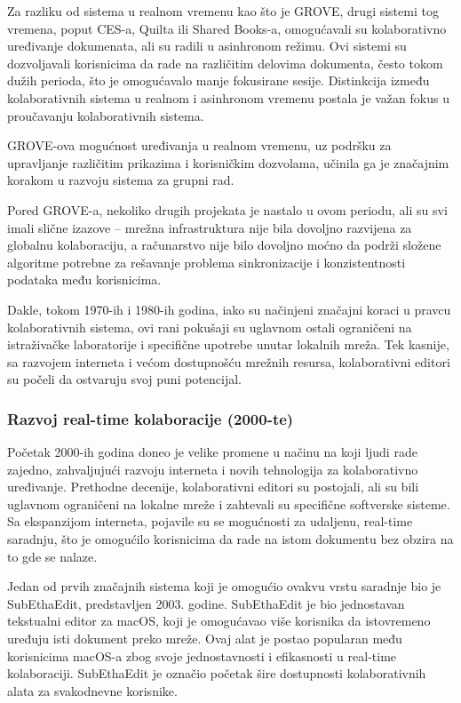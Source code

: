 \documentclass[12pt]{article}
\begin{document}
Za razliku od sistema u realnom vremenu kao što je GROVE, drugi sistemi tog vremena, poput CES-a, Quilta ili Shared Books-a, omogućavali su kolaborativno uređivanje dokumenata, ali su radili u asinhronom režimu. Ovi sistemi su dozvoljavali korisnicima da rade na različitim delovima dokumenta, često tokom dužih perioda, što je omogućavalo manje fokusirane sesije. Distinkcija između kolaborativnih sistema u realnom i asinhronom vremenu postala je važan fokus u proučavanju kolaborativnih sistema.
    
GROVE-ova mogućnost uređivanja u realnom vremenu, uz podršku za upravljanje različitim prikazima i korisničkim dozvolama, učinila ga je značajnim korakom u razvoju sistema za grupni rad.
    
Pored GROVE-a, nekoliko drugih projekata je nastalo u ovom periodu, ali su svi imali slične izazove – mrežna infrastruktura nije bila dovoljno razvijena za globalnu kolaboraciju, a računarstvo nije bilo dovoljno moćno da podrži složene algoritme potrebne za rešavanje problema sinkronizacije i konzistentnosti podataka među korisnicima.
    
Dakle, tokom 1970-ih i 1980-ih godina, iako su načinjeni značajni koraci u pravcu kolaborativnih sistema, ovi rani pokušaji su uglavnom ostali ograničeni na istraživačke laboratorije i specifične upotrebe unutar lokalnih mreža. Tek kasnije, sa razvojem interneta i većom dostupnošću mrežnih resursa, kolaborativni editori su počeli da ostvaruju svoj puni potencijal.

\subsubsection{Razvoj real-time kolaboracije (2000-te)}

Početak 2000-ih godina doneo je velike promene u načinu na koji ljudi rade zajedno, zahvaljujući razvoju interneta i novih tehnologija za kolaborativno uređivanje. Prethodne decenije, kolaborativni editori su postojali, ali su bili uglavnom ograničeni na lokalne mreže i zahtevali su specifične softverske sisteme. Sa ekspanzijom interneta, pojavile su se mogućnosti za udaljenu, real-time saradnju, što je omogućilo korisnicima da rade na istom dokumentu bez obzira na to gde se nalaze.

Jedan od prvih značajnih sistema koji je omogućio ovakvu vrstu saradnje bio je SubEthaEdit, predstavljen 2003. godine. SubEthaEdit je bio jednostavan tekstualni editor za macOS, koji je omogućavao više korisnika da istovremeno uređuju isti dokument preko mreže. Ovaj alat je postao popularan među korisnicima macOS-a zbog svoje jednostavnosti i efikasnosti u real-time kolaboraciji. SubEthaEdit je označio početak šire dostupnosti kolaborativnih alata za svakodnevne korisnike.
    
\end{document}
